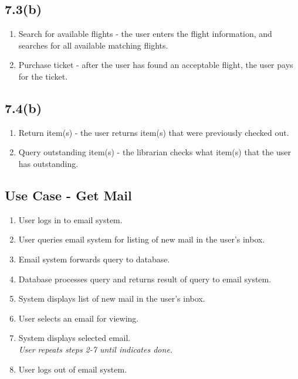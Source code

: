 \documentclass{article}[12pt]
\begin{document}
  \subsection*{7.3(b)}
    \begin{enumerate}
      \item Search for available flights - the user enters the flight information, and searches for all available matching flights. 
      \item Purchase ticket - after the user has found an acceptable flight, the user pays for the ticket.
    \end{enumerate}

  \subsection*{7.4(b)}
    \begin{enumerate}
      \item Return item(s) - the user returns item(s) that were previously checked out.
      \item Query outstanding item(s) - the librarian checks what item(s) that the user has outstanding.
    \end{enumerate}

  \subsection*{Use Case - Get Mail}
    \begin{enumerate}
      \item User logs in to email system.
      \item User queries email system for listing of new mail in the user's inbox.
      \item Email system forwards query to database.
      \item Database processes query and returns result of query to email system.
      \item System displays list of new mail in the user's inbox.
      \item User selects an email for viewing.
      \item System displays selected email. \\
            \emph{User repeats steps 2-7 until indicates done.}
      \item User logs out of email system.
    \end{enumerate} 
\end{document}
